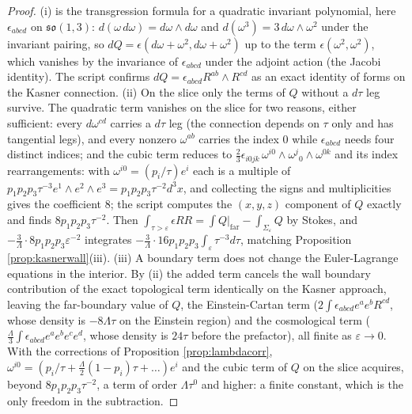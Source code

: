 \documentclass[11pt]{article}
\theoremstyle{definition}
\begin{document}
\begin{proof}
(i) is the transgression formula for a quadratic invariant polynomial, here $\epsilon_{abcd}$ on $\mathfrak{so}(1,3)$: $d(\omega\,d\omega) = d\omega\wedge d\omega$ and $d(\omega^3) = 3\,d\omega\wedge\omega^2$ under the invariant pairing, so $dQ = \epsilon(d\omega + \omega^2, d\omega + \omega^2)$ up to the term $\epsilon(\omega^2,\omega^2)$, which vanishes by the invariance of $\epsilon_{abcd}$ under the adjoint action (the Jacobi identity). The script confirms $dQ = \epsilon_{abcd}R^{ab}\wedge R^{cd}$ as an exact identity of forms on the Kasner connection. (ii) On the slice only the terms of $Q$ without a $d\tau$ leg survive. The quadratic term vanishes on the slice for two reasons, either sufficient: every $d\omega^{cd}$ carries a $d\tau$ leg (the connection depends on $\tau$ only and has tangential legs), and every nonzero $\omega^{ab}$ carries the index $0$ while $\epsilon_{abcd}$ needs four distinct indices; and the cubic term reduces to $\tfrac23\epsilon_{i0jk}\,\omega^{i0}\wedge\omega^{j}{}_{0}\wedge\omega^{0k}$ and its index rearrangements: with $\omega^{i0} = (p_i/\tau)e^i$ each is a multiple of $p_1p_2p_3\tau^{-3}e^1\wedge e^2\wedge e^3 = p_1p_2p_3\tau^{-2}d^3x$, and collecting the signs and multiplicities gives the coefficient $8$; the script computes the $(x,y,z)$ component of $Q$ exactly and finds $8p_1p_2p_3\tau^{-2}$. Then $\int_{\tau>\varepsilon}\epsilon RR = \int Q\big|_{\text{far}} - \int_{\Sigma_\varepsilon}Q$ by Stokes, and $-\tfrac3\Lambda\cdot 8p_1p_2p_3\varepsilon^{-2}$ integrates $-\tfrac{3}{\Lambda}\cdot 16 p_1p_2p_3\int_\varepsilon\tau^{-3}d\tau$, matching Proposition \ref{prop:kasnerwall}(iii). (iii) A boundary term does not change the Euler-Lagrange equations in the interior. By (ii) the added term cancels the wall boundary contribution of the exact topological term identically on the Kasner approach, leaving the far-boundary value of $Q$, the Einstein-Cartan term ($2\int\epsilon_{abcd}e^ae^bR^{cd}$, whose density is $-8\Lambda\tau$ on the Einstein region) and the cosmological term ($\tfrac{\Lambda}{3}\int\epsilon_{abcd}e^ae^be^ce^d$, whose density is $24\tau$ before the prefactor), all finite as $\varepsilon\to 0$. With the corrections of Proposition \ref{prop:lambdacorr}, $\omega^{i0} = (p_i/\tau + \tfrac{\Lambda}{2}(1-p_i)\tau + \dots)e^i$ and the cubic term of $Q$ on the slice acquires, beyond $8p_1p_2p_3\tau^{-2}$, a term of order $\Lambda\tau^0$ and higher: a finite constant, which is the only freedom in the subtraction.
\end{proof}
\end{document}
